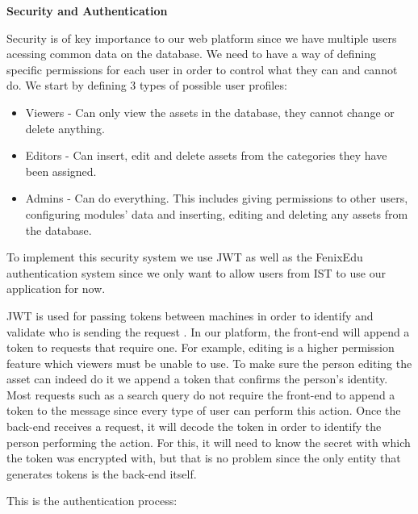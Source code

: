 \vspace{4mm}
\textbf{Security and Authentication}
\vspace{2mm}

Security is of key importance to our web platform since we have multiple users acessing common data on the database. We need to have a way of defining specific permissions for each user in order to control what they can and cannot do. We start by defining 3 types of possible user profiles:

\begin{itemize}
    \item Viewers - Can only view the assets in the database, they cannot change or delete anything.
    \item Editors - Can insert, edit and delete assets from the categories they have been assigned.
    \item Admins - Can do everything. This includes giving permissions to other users, configuring modules' data and inserting, editing and deleting any assets from the database.
\end{itemize}

To implement this security system we use JWT as well as the FenixEdu authentication system \cite{Silva2002TheProject} since we only want to allow users from IST to use our application for now.


JWT is used for passing tokens between machines in order to identify and validate who is sending the request \cite{Shingala2019JSONMQTT}. In our platform, the front-end will append a token to requests that require one. For example, editing is a higher permission feature which viewers must be unable to use. To make sure the person editing the asset can indeed do it we append a token that confirms the person's identity. Most requests such as a search query do not require the front-end to append a token to the message since every type of user can perform this action. Once the back-end receives a request, it will decode the token in order to identify the person performing the action. For this, it will need to know the secret with which the token was encrypted with, but that is no problem since the only entity that generates tokens is the back-end itself.

This is the authentication process:

